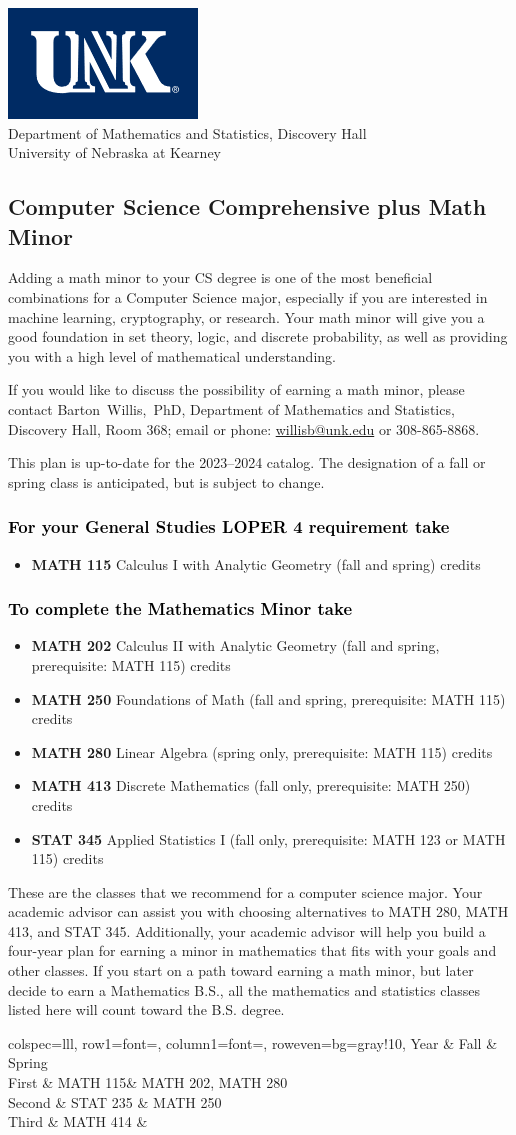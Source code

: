 \documentclass[10pt]{article}
\makeatletter
\newcommand{\calcone}{\textbf{MATH 115} Calculus I with Analytic Geometry (fall and spring) \dotfill 5 credits}
\newcommand{\calconeshort}{MATH 115}
\newcommand{\calctwo}{\textbf{MATH 202} Calculus II with Analytic Geometry (fall and spring, prerequisite: MATH 115) \dotfill 5 credits }
\newcommand{\calctwoshort}{MATH 202}
\newcommand{\foundations}{\textbf{MATH 250} Foundations of Math (fall and spring, prerequisite: MATH 115)  \dotfill 3 credits}
\newcommand{\linear}{\textbf{MATH 280} Linear Algebra (spring only, prerequisite: MATH 115) \dotfill 3 credits}
\newcommand{\linearshort}{MATH 280}
\newcommand{\discrete}{\textbf{MATH 413} Discrete Mathematics  (fall only, prerequisite: MATH 250)\dotfill 3 credits}
\newcommand{\discreteshort}{MATH 413}
\newcommand{\appliedstat}{\textbf{STAT 345} Applied Statistics I (fall only, prerequisite: MATH 123 or MATH 115) \dotfill 3 credits}
\newcommand{\appliedstatshort}{STAT 345}
\newcommand{\contactbw}{\mbox{Barton Willis, PhD}, Department of Mathematics and Statistics,  Discovery Hall, Room 368;
email or phone: \href{mailto:willisb@unk.edu}{willisb@unk.edu} or 308-865-8868.}
\newcommand{\forinfo}[2]{If you would like to discuss the possibility of earning a math {#1}, please contact \contactbw}
\newcommand{\catalog}{2023--2024 }
\newcommand{\LOPER}{LOPER\xspace}
\newcommand{\uptodate}{This plan is up-to-date for  the \catalog catalog. The designation of a fall or spring class is 
anticipated, but  is subject to change.}
\newcommand{\myheading}{
\begin{flushleft}
\includegraphics[scale=0.3]{unk-logo}\\
\setcounter{footnote}{0}
\vspace{0.25in}
 \textcolor{unkblue}{Department of Mathematics and Statistics, Discovery Hall} \\
  \textcolor{unkblue}{University of Nebraska at Kearney}
\end{flushleft}}
\newcommand{\mathminor}{      
\begin{table}[h]
  \caption*{Suggested Math Minor program of study}
   \center
  \begin{tblr}{
      colspec={lll},
      row{1}={font=\bfseries},
      column{1}={font=\itshape},
      row{even}={bg=gray!10},
    }
     Year        & Fall  & Spring   \\
    \toprule
    First & \calconeshort  & \calctwoshort, \linearshort  \\
    Second & STAT 235 & MATH 250  \\
    Third & MATH 414 & \\
    \bottomrule
  \end{tblr}
\end{table}}
\makeatother
\begin{document}
\myheading


\subsection*{\textbf{\textcolor{unkblue}{Computer Science Comprehensive plus Math Minor}}}

Adding a math minor to your CS degree is one of the most beneficial 
combinations for a Computer Science major, especially if you are interested 
in machine learning, cryptography, or research. Your math minor will 
give you a good foundation in set theory, logic, and discrete probability, as 
well as providing you with a high level of mathematical understanding.


\forinfo{minor}{Computer Science Comprehensive degree}

\uptodate

\vspace{-0.1in}

\subsubsection*{\textcolor{black}{For your General Studies \LOPER 4 requirement take}}
\begin{itemize}
\item  \calcone
\end{itemize}

\subsubsection*{\textcolor{black}{To complete the Mathematics Minor take}}
\begin{itemize}
\item \calctwo
\item \foundations
\item \linear
\item \discrete
\item \appliedstat
\end{itemize}
\vspace{0.1in}
These are the classes that we recommend for a computer science major.
Your academic advisor can assist you with choosing alternatives 
to \linearshort, \discreteshort, and \appliedstatshort. Additionally,
your academic advisor will help you build a 
four-year plan for earning a minor in mathematics that fits with 
your goals and other classes.  If you start on a path toward earning a math minor, but later decide to 
earn a Mathematics B.S., all the mathematics and statistics  classes listed here 
will count toward the B.S. degree. 
\mathminor
\end{document}
